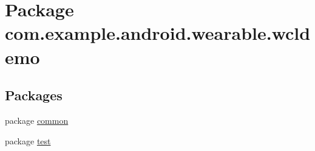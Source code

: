 \hypertarget{namespacecom_1_1example_1_1android_1_1wearable_1_1wcldemo}{}\section{Package com.\+example.\+android.\+wearable.\+wcldemo}
\label{namespacecom_1_1example_1_1android_1_1wearable_1_1wcldemo}
\subsection*{Packages}
\begin{DoxyCompactItemize}
\item 
package \hyperlink{namespacecom_1_1example_1_1android_1_1wearable_1_1wcldemo_1_1common}{common}
\item 
package \hyperlink{namespacecom_1_1example_1_1android_1_1wearable_1_1wcldemo_1_1test}{test}
\end{DoxyCompactItemize}
